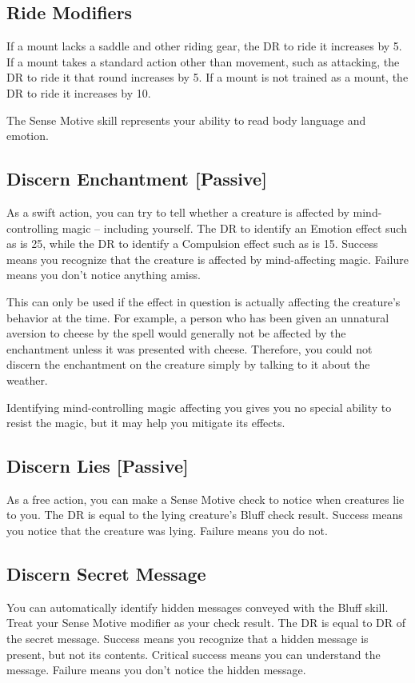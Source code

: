     \subsection{Ride Modifiers}\label{Ride Modifiers}
        If a mount lacks a saddle and other riding gear, the DR to ride it increases by 5. If a mount takes a standard action other than movement, such as attacking, the DR to ride it that round increases by 5. If a mount is not trained as a mount, the DR to ride it increases by 10.

        The Sense Motive skill represents your ability to read body language and emotion.

    \subsection{Discern Enchantment [Passive]}
        As a swift action, you can try to tell whether a creature is affected by mind-controlling magic -- including yourself. The DR to identify an Emotion effect such as  is 25, while the DR to identify a Compulsion effect such as  is 15. Success means you recognize that the creature is affected by mind-affecting magic. Failure means you don't notice anything amiss.

        This can only be used if the effect in question is actually affecting the creature's behavior at the time. For example, a person who has been given an unnatural aversion to cheese by the  spell would generally not be affected by the enchantment unless it was presented with cheese. Therefore, you could not discern the enchantment on the creature simply by talking to it about the weather.

        Identifying mind-controlling magic affecting you gives you no special ability to resist the magic, but it may help you mitigate its effects.

    \subsection{Discern Lies [Passive]}
        As a free action, you can make a Sense Motive check to notice when creatures lie to you. The DR is equal to the lying creature's Bluff check result. Success means you notice that the creature was lying. Failure means you do not.

    \subsection{Discern Secret Message}
        You can automatically identify hidden messages conveyed with the Bluff skill. Treat your Sense Motive modifier as your check result. The DR is equal to DR of the secret message. Success means you recognize that a hidden message is present, but not its contents. Critical success means you can understand the message. Failure means you don't notice the hidden message.

